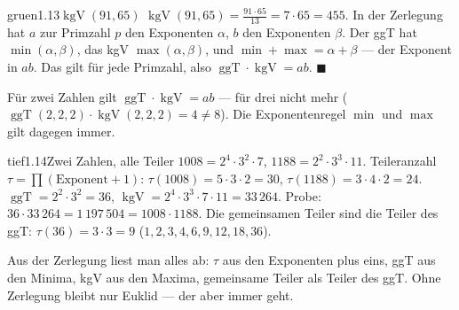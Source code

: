 \begin{loesungkarte}{gruen}{1.13}{$\operatorname{kgV}(91, 65)$}
$\operatorname{kgV}(91, 65) = \frac{91\cdot65}{13} = 7\cdot65 = 455$.
In der Zerlegung hat $a$ zur Primzahl $p$ den Exponenten $\alpha$, $b$ den Exponenten $\beta$. Der ggT hat $\min(\alpha, \beta)$, das kgV $\max(\alpha, \beta)$, und $\min + \max = \alpha + \beta$ --- der Exponent in $ab$. Das gilt für jede Primzahl, also $\operatorname{ggT}\cdot\operatorname{kgV} = ab$. $\blacksquare$
\begin{mitnehmen}\kastentext
Für zwei Zahlen gilt $\operatorname{ggT}\cdot\operatorname{kgV} = ab$ --- für drei nicht mehr ($\operatorname{ggT}(2, 2, 2)\cdot\operatorname{kgV}(2, 2, 2) = 4\neq8$). Die Exponentenregel $\min$ und $\max$ gilt dagegen immer.
\end{mitnehmen}
\end{loesungkarte}

\begin{loesungkarte}{tief}{1.14}{Zwei Zahlen, alle Teiler}
$1008 = 2^{4}\cdot3^{2}\cdot7$, $1188 = 2^{2}\cdot3^{3}\cdot11$.
Teileranzahl $\tau = \prod(\text{Exponent} + 1)$: $\tau(1008) = 5\cdot3\cdot2 = 30$, $\tau(1188) = 3\cdot4\cdot2 = 24$.
$\operatorname{ggT} = 2^{2}\cdot3^{2} = 36$, $\operatorname{kgV} = 2^{4}\cdot3^{3}\cdot7\cdot11 = 33\,264$. Probe: $36\cdot33\,264 = 1\,197\,504 = 1008\cdot1188$. \checkmark
{}
Die gemeinsamen Teiler sind die Teiler des ggT: $\tau(36) = 3\cdot3 = 9$ ($1, 2, 3, 4, 6, 9, 12, 18, 36$).
\begin{mitnehmen}\kastentext
Aus der Zerlegung liest man alles ab: $\tau$ aus den Exponenten plus eins, ggT aus den Minima, kgV aus den Maxima, gemeinsame Teiler als Teiler des ggT. Ohne Zerlegung bleibt nur Euklid --- der aber immer geht.
\end{mitnehmen}
\end{loesungkarte}

